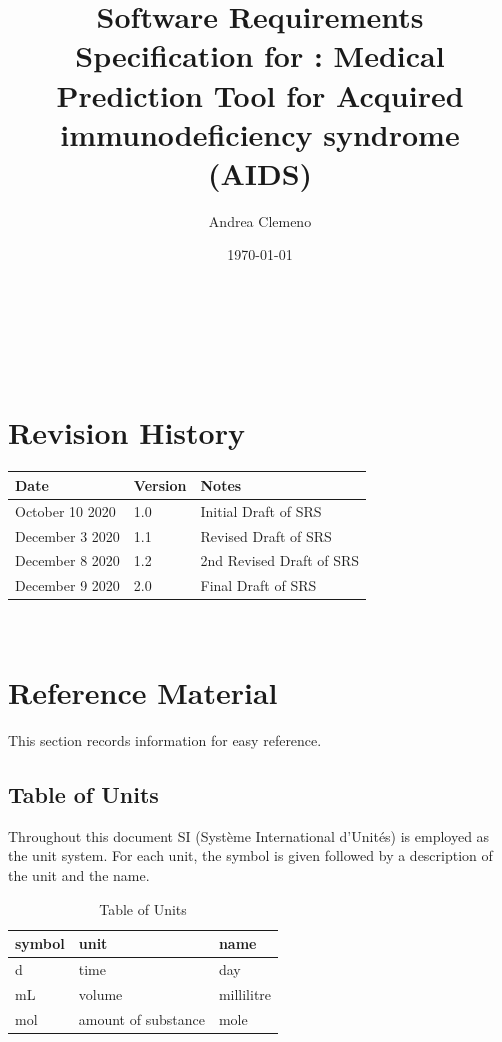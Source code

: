 \documentclass[12pt]{article}
\begin{document}
\title{Software Requirements Specification for \progname: Medical Prediction 
Tool for Acquired immunodeficiency syndrome (AIDS)} 
\author{Andrea Clemeno}
\date{\today}
	
\maketitle

~\newpage


\tableofcontents

~\newpage

\section*{Revision History}

\begin{tabularx}{\textwidth}{p{3cm}p{2cm}X}
\toprule {\bf Date} & {\bf Version} & {\bf Notes}\\
\midrule
October 10 2020 & 1.0 & Initial Draft of SRS\\
December 3 2020 & 1.1 & Revised Draft of SRS\\
December 8 2020 & 1.2 & 2nd Revised Draft of SRS\\
December 9 2020 & 2.0 & Final Draft of SRS\\
\bottomrule
\end{tabularx}

~\newpage

\section{Reference Material}

This section records information for easy reference.

\subsection{Table of Units}

Throughout this document SI (Syst\`{e}me International d'Unit\'{e}s) is employed
as the unit system. For each unit, the symbol is given followed by a
description of the unit and the name.

\renewcommand{\arraystretch}{1.2}
\begin{table}[h!]
\begin{center}
 \noindent \begin{tabular}{l l l}
    \toprule		
    \textbf{symbol} & \textbf{unit} & \textbf{name}\\
    \midrule 
    \si{\day} & time & day\\
    mL & volume	& millilitre\\
    \si{\mole} & amount of substance & mole\\
    \bottomrule
  \end{tabular}
  \end{center}
  	\caption{Table of Units}
\end{table}
\end{document}
